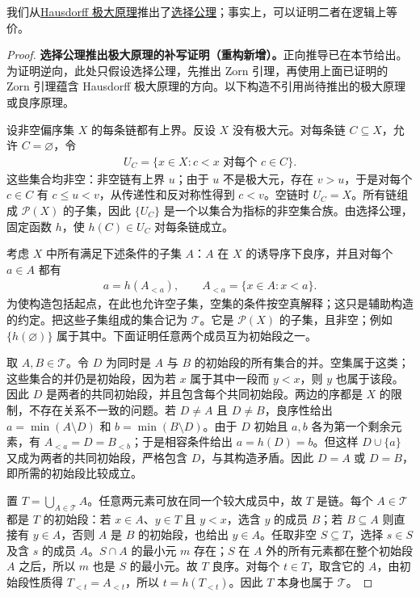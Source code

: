 \documentclass[../../main.tex]{subfiles}%
\begin{document}
我们从\hyperref[principle:ch00-hausdorff-maximal]{Hausdorff 极大原理}推出了\hyperref[axiom:ch00-choice]{选择公理}；事实上，可以证明二者在逻辑上等价。
\begin{proof}
\textbf{选择公理推出极大原理的补写证明（重构新增）。}正向推导已在本节给出。为证明逆向，此处只假设选择公理，先推出 Zorn 引理，再使用上面已证明的 Zorn 引理蕴含 Hausdorff 极大原理的方向。以下构造不引用尚待推出的极大原理或良序原理。

设非空偏序集 $X$ 的每条链都有上界。反设 $X$ 没有极大元。对每条链 $C\subseteq X$，允许 $C=\varnothing$，令
\begin{align*}
U_C=\{x\in X:c<x\text{ 对每个 }c\in C\}.
\end{align*}
这些集合均非空：非空链有上界 $u$；由于 $u$ 不是极大元，存在 $v>u$，于是对每个 $c\in C$ 有 $c\leqslant u<v$，从传递性和反对称性得到 $c<v$。空链时 $U_C=X$。所有链组成 $\mathscr{P}(X)$ 的子集，因此 $\{U_C\}$ 是一个以集合为指标的非空集合族。由选择公理，固定函数 $h$，使 $h(C)\in U_C$ 对每条链成立。

考虑 $X$ 中所有满足下述条件的子集 $A$：$A$ 在 $X$ 的诱导序下良序，并且对每个 $a\in A$ 都有
\begin{align*}
a=h(A_{<a}),\qquad A_{<a}=\{x\in A:x<a\}.
\end{align*}
为使构造包括起点，在此也允许空子集，空集的条件按空真解释；这只是辅助构造的约定。把这些子集组成的集合记为 $\mathscr{T}$。它是 $\mathscr{P}(X)$ 的子集，且非空；例如 $\{h(\varnothing)\}$ 属于其中。下面证明任意两个成员互为初始段之一。

取 $A,B\in\mathscr{T}$。令 $D$ 为同时是 $A$ 与 $B$ 的初始段的所有集合的并。空集属于这类；这些集合的并仍是初始段，因为若 $x$ 属于其中一段而 $y<x$，则 $y$ 也属于该段。因此 $D$ 是两者的共同初始段，并且包含每个共同初始段。两边的序都是 $X$ 的限制，不存在关系不一致的问题。若 $D\ne A$ 且 $D\ne B$，良序性给出 $a=\min(A\setminus D)$ 和 $b=\min(B\setminus D)$。由于 $D$ 初始且 $a,b$ 各为第一个剩余元素，有 $A_{<a}=D=B_{<b}$；于是相容条件给出 $a=h(D)=b$。但这样 $D\cup\{a\}$ 又成为两者的共同初始段，严格包含 $D$，与其构造矛盾。因此 $D=A$ 或 $D=B$，即所需的初始段比较成立。

置 $T=\bigcup_{A\in\mathscr{T}}A$。任意两元素可放在同一个较大成员中，故 $T$ 是链。每个 $A\in\mathscr{T}$ 都是 $T$ 的初始段：若 $x\in A$、$y\in T$ 且 $y<x$，选含 $y$ 的成员 $B$；若 $B\subseteq A$ 则直接有 $y\in A$，否则 $A$ 是 $B$ 的初始段，也给出 $y\in A$。任取非空 $S\subseteq T$，选择 $s\in S$ 及含 $s$ 的成员 $A$。$S\cap A$ 的最小元 $m$ 存在；$S$ 在 $A$ 外的所有元素都在整个初始段 $A$ 之后，所以 $m$ 也是 $S$ 的最小元。故 $T$ 良序。对每个 $t\in T$，取含它的 $A$，由初始段性质得 $T_{<t}=A_{<t}$，所以 $t=h(T_{<t})$。因此 $T$ 本身也属于 $\mathscr{T}$。


\end{proof}
\end{document}
